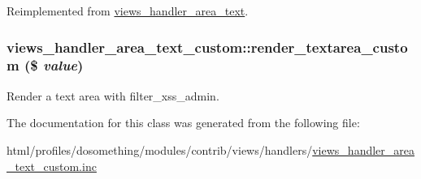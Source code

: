 Reimplemented from \hyperlink{classviews__handler__area__text_a61ad1d6b876311e1d09576230654a794}{views\_\-handler\_\-area\_\-text}.\hypertarget{classviews__handler__area__text__custom_a02f20635fa1e858df9bb64768efb1f00}{
\subsubsection[{render\_\-textarea\_\-custom}]{\setlength{\rightskip}{0pt plus 5cm}views\_\-handler\_\-area\_\-text\_\-custom::render\_\-textarea\_\-custom (\$ {\em value})}}
\label{classviews__handler__area__text__custom_a02f20635fa1e858df9bb64768efb1f00}
Render a text area with filter\_\-xss\_\-admin. 

The documentation for this class was generated from the following file:\begin{DoxyCompactItemize}
\item 
html/profiles/dosomething/modules/contrib/views/handlers/\hyperlink{views__handler__area__text__custom_8inc}{views\_\-handler\_\-area\_\-text\_\-custom.inc}\end{DoxyCompactItemize}
